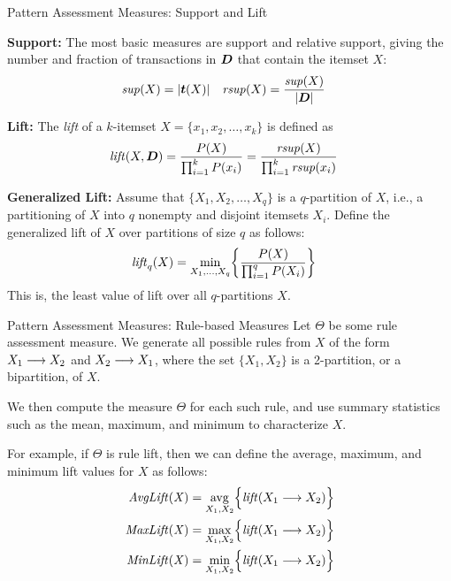 \ifdefined\wox \begin{frame} \titlepage \end{frame} \fi

\begin{frame}{Pattern Assessment Measures: Support and Lift}

  {\bf Support:} The most basic measures are support and relative
  support, giving the number and fraction of transactions in ${\boldsymbol D}$ that
  contain the itemset $X$:
\begin{align*}
  \mathit{sup}(X) & = |{{\boldsymbol t}}(X)| &
  \mathit{rsup}(X) & = \frac{\mathit{sup}(X)}{|{\boldsymbol D}|}
\end{align*}

\medskip
{\bf Lift:} The {\em lift} of a $k$-itemset
$X=\{x_1,x_2,\ldots,x_k\}$ is def\/{i}ned as
\begin{align*}
  \mathit{lift}(X, {\boldsymbol D}) &= \frac{P(X)}{\prod_{i=1}^k P(x_i)}
  = \frac{\mathit{rsup}(X)}{\prod_{i=1}^k \mathit{rsup}(x_i)}
\end{align*}

\medskip
{\bf Generalized Lift:} 
Assume that
$\{X_1,X_2,\ldots,X_q\}$ is a $q$-partition of $X$, i.e., a
partitioning of $X$ into $q$ nonempty and disjoint itemsets $X_i$.
Def\/{i}ne
the generalized lift of $X$ over partitions of size $q$ as
follows:
\begin{align*}
  \mathit{lift}_q(X)  & = \min_{X_1,\ldots,X_q}
  \biggl\{ \frac{P(X)}{\prod_{i=1}^q P(X_i)} \biggr\}
\end{align*}
This is, the least value of lift over all $q$-partitions
$X$.
\end{frame}


\begin{frame}{Pattern Assessment Measures: Rule-based Measures}
Let $\Theta$ be some rule assessment measure.
We
generate all possible rules from $X$ of the form
$X_1 \arule X_2$ and $X_2 \arule X_1$, where
the set $\{X_1,X_2\}$ is a 2-partition, or a bipartition, of $X$.

\medskip
We then compute the measure $\Theta$ for each such rule, and
use summary statistics such as the mean, maximum, and minimum to characterize $X$.

\medskip
For example, if $\Theta$ is rule lift, then we can def\/{i}ne the average,
maximum, and minimum lift values for $X$ as follows:
\begin{align*}
  \mathit{AvgLift(X)} & =
  \mathop{\avg}_{X_1,X_2} \Bigl\{ \lift(X_1\arule X_2) \Bigr\}\\
  \mathit{MaxLift(X)} &
  = \max_{X_1,X_2} \Bigl\{ \lift(X_1\arule X_2) \Bigr\}\\
  \mathit{MinLift(X)} &
  = \min_{X_1,X_2} \Bigl\{ \lift(X_1\arule X_2) \Bigr\}
\end{align*}
\end{frame}


